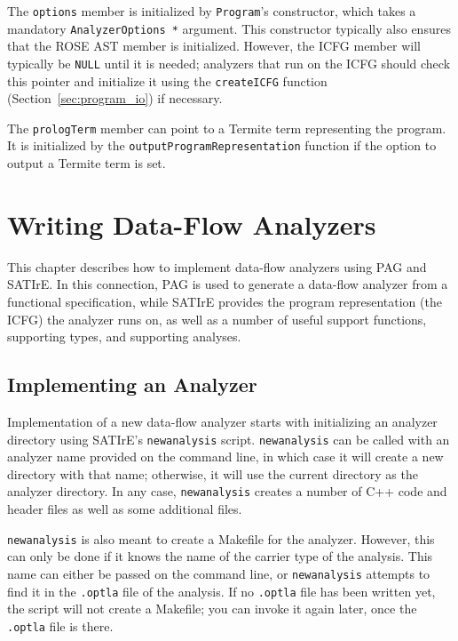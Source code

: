 \documentclass[a4paper,12pt]{report}
\begin{document}
The \texttt{options} member is initialized by \texttt{Program}'s
constructor, which takes a mandatory \verb|AnalyzerOptions *| argument. This
constructor typically also ensures that the ROSE AST member is initialized.
However, the ICFG member will typically be \texttt{NULL} until it is needed;
analyzers that run on the ICFG should check this pointer and initialize it
using the \texttt{createICFG} function (Section~\ref{sec:program_io}) if
necessary.

The \texttt{prologTerm} member can point to a Termite term representing the
program. It is initialized by the \texttt{outputProgramRepresentation}
function if the option to output a Termite term is set.

\chapter{Writing Data-Flow Analyzers}
\label{chap:data_flow}

This chapter describes how to implement data-flow analyzers using PAG and
SATIrE. In this connection, PAG is used to generate a data-flow analyzer
from a functional specification, while SATIrE provides the program
representation (the ICFG) the analyzer runs on, as well as a number of
useful support functions, supporting types, and supporting analyses.

\section{Implementing an Analyzer}
\label{sec:pag_analyzer}

Implementation of a new data-flow analyzer starts with initializing an
analyzer directory using SATIrE's \texttt{newanalysis} script.
\texttt{newanalysis} can be called with an analyzer name provided on the
command line, in which case it will create a new directory with that name;
otherwise, it will use the current directory as the analyzer directory. In
any case, \texttt{newanalysis} creates a number of C++ code and header files
as well as some additional files.

\texttt{newanalysis} is also meant to create a Makefile for the analyzer.
However, this can only be done if it knows the name of the carrier type of
the analysis. This name can either be passed on the command line, or
\texttt{newanalysis} attempts to find it in the \texttt{.optla} file of the
analysis. If no \texttt{.optla} file has been written yet, the script will
not create a Makefile; you can invoke it again later, once the
\texttt{.optla} file is there.
\end{document}
